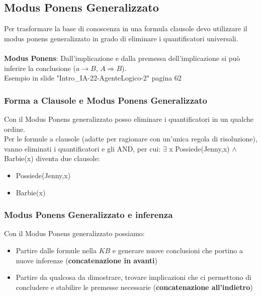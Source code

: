 \documentclass[../main.tex]{subfiles}
\begin{document}
	\subsection{Modus Ponens Generalizzato}
	Per trasformare la base di conoscenza in una formula clausole devo utilizzare il modus ponens generalizzato in grado di eliminare i quantificatori universali.\\\\
	\textbf{Modus Ponens}: Dall'implicazione e dalla premessa dell'implicazione si può inferire la conclusione ($a \rightarrow B$, $A \Rightarrow B$). \\
	{\color{red} Esempio in slide "Intro\_IA-22-AgenteLogico-2" pagina 62}
	\subsubsection{Forma a Clausole e Modus Ponens Generalizzato}
	Con il Modus Ponens generalizzato posso eliminare i quantificatori in un qualche ordine. \\
	Per le formule a clausole (adatte per ragionare con un’unica regola di risoluzione), vanno eliminati i quantificatori e gli AND, per cui: $\exists$ x Possiede(Jenny,x) $\wedge$ Barbie(x) diventa due clausole:
	\begin{itemize}
		\item Possiede(Jenny,x)
		\item Barbie(x)
	\end{itemize}
	\subsubsection{Modus Ponens Generalizzato e inferenza}
	Con il Modus Ponens generalizzato possiamo:
	\begin{itemize}
		\item Partire dalle formule nella $KB$ e generare nuove conclusioni che portino a nuove inferenze (\textbf{concatenazione in avanti})
		\item Partire da qualcosa da dimostrare, trovare implicazioni che ci permettono di concludere e stabilire le premesse necessarie (\textbf{concatenazione all'indietro})
	\end{itemize}
\end{document}

